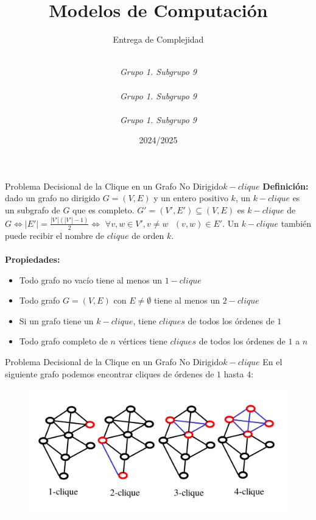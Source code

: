 \documentclass[10pt, envcountsect, presentation, aspectratio=169]{beamer}
\title[Nombre]{Modelos de Computación}
\subtitle{Entrega de Complejidad} %
\author[Carrillo G., Gallego J., Ibarrola Y.] %
{
	\sc{Ginés Carrillo Ibáñez}\\  %
	\textit{Grupo 1. Subgrupo 9}\\
	\sc{Juan Diego Gallego Nicolás}\\ %
	\textit{Grupo 1. Subgrupo 9}\\ 
	\sc{Yago Ibarrola Lapeña}\\ %
	\textit{Grupo 1. Subgrupo 9}\\ 
}
\institute[GII]%
{
	\textit{Universidad de Murcia}
}
\date{2024/2025} %
\begin{document}
	



\begin{frame}[plain]
	\titlepage
\end{frame}


\begin{frame}{Problema Decisional de la Clique en un Grafo No Dirigido}{$k-clique$}
    \textbf{Definición:} dado un grafo no dirigido $G=(V,E)$ y un entero positivo $k$, un $k-clique$ es un subgrafo de $G$ que es completo. $G'=(V',E') \subseteq (V,E)$ es $k-clique$ de $G \Leftrightarrow |E'| = \frac{|V'|(|V'|-1)}{2} \Leftrightarrow$ $\forall v, w \in V', v \neq w \text{ } (v,w)\in E'$. Un $k-clique$ también puede recibir el nombre de $clique$ de orden $k$. \\~\\

    \textbf{Propiedades:}

    \begin{itemize}
        \item[] Todo grafo no vacío tiene al menos un $1-clique$
        \item[] Todo grafo $G=(V,E)$ con $E \neq \emptyset$ tiene al menos un $2-clique$
        \item[] Si un grafo tiene un $k-clique$, tiene $cliques$ de todos los órdenes de $1$ 
        \item[] Todo grafo completo de $n$ vértices tiene $cliques$ de todos los órdenes de $1$ a $n$
    \end{itemize}
    
\end{frame}

\begin{frame}{Problema Decisional de la Clique en un Grafo No Dirigido}{$k-clique$}
    En el siguiente grafo podemos encontrar cliques de órdenes de $1$ hasta $4$:
    \begin{figure}
        \includegraphics[scale=0.25]{images/T2_2_ejemploclique.png}
    \end{figure} 
\end{frame}
\end{document}
